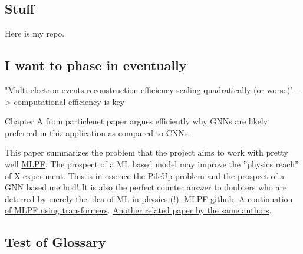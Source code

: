 \subsection*{Stuff}

Here is my repo. \cite{petren2026-msceng-ldmx-github}

\subsection*{I want to phase in eventually}

"Multi-electron events reconstruction efficiency scaling quadratically (or worse)" -> computational efficiency is key


Chapter A from particlenet paper \cite{qu2019-particlenet} argues efficiently why GNNs are likely preferred in this application as compared to CNNs. 

This paper summarizes the problem that the project aims to work with pretty well \href{https://arxiv.org/pdf/2101.08578}{MLPF}. The prospect of a ML based model may improve the ''physics reach'' of X experiment. This is in essence the PileUp problem and the prospect of a GNN based method! It is also the perfect counter answer to doubters who are deterred by merely the idea of ML in physics (!). \href{https://github.com/jpata/particleflow}{MLPF github}. \href{https://arxiv.org/pdf/2601.17554}{A continuation of MLPF using transformers}. \href{https://arxiv.org/pdf/2601.17554}{Another related paper by the same authors}. 

\subsection*{Test of Glossary}

\glosstestsnippet

